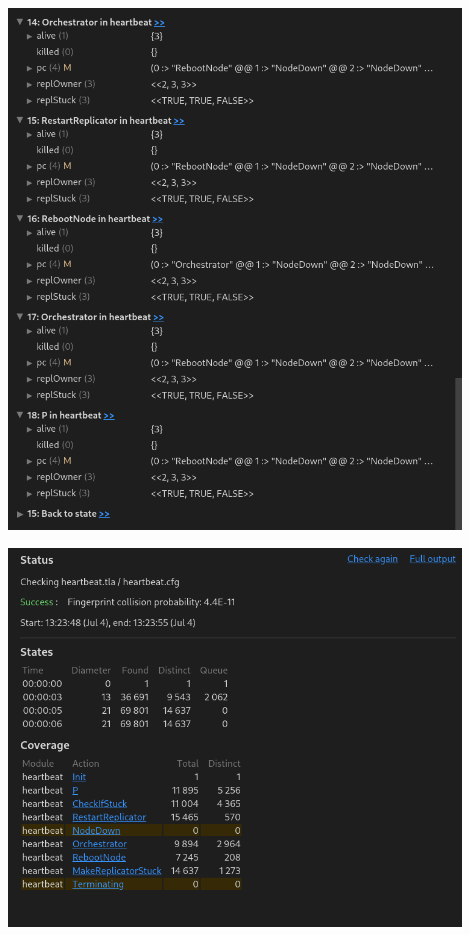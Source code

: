 \documentclass{beamer}
\begin{document}
\begin{frame}
    \includegraphics[width=0.9\textwidth, height=0.9\textheight]{examples/img1.png}
\end{frame}


\begin{frame}
    \includegraphics[width=0.9\textwidth, height=0.9\textheight]{examples/img2.png}
\end{frame}
\end{document}
